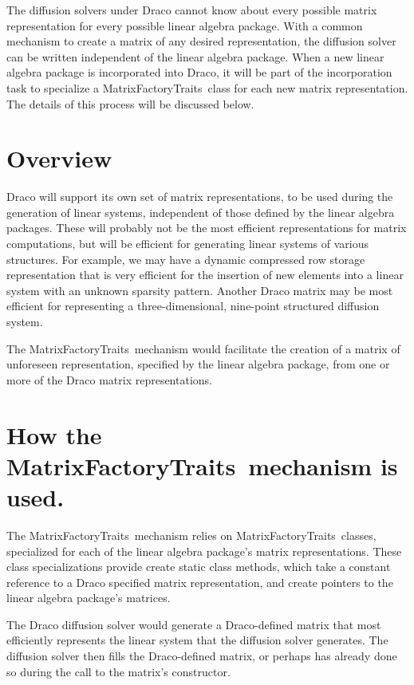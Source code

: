 \documentclass[11pt]{nmemo}
\newcommand{\code}[1]{\textcolor{codecolor}{#1}}
\newcommand{\MFT}{\code{MatrixFactoryTraits}\ }
\begin{document}
The diffusion solvers under Draco cannot know about every possible matrix
representation for every possible linear algebra package.
With a common mechanism to create a matrix of any desired representation,
the diffusion solver can be written independent of the linear algebra
package.
When a new linear algebra package is incorporated into Draco, it will be part
of the incorporation task to specialize a \MFT class
for each new matrix representation.
The details of this process will be discussed below.

\section{Overview}

Draco will support its own set of matrix representations, to be used during
the generation of linear systems, independent of those defined by the 
linear algebra packages.
These will probably not be the most efficient representations for matrix
computations, but will be efficient for generating linear systems of various
structures.
For example, we may have a dynamic compressed row storage representation that
is very efficient for the insertion of new elements into a linear
system with an unknown sparsity pattern.
Another Draco matrix may be most efficient for representing a three-dimensional,
nine-point structured diffusion system.

The \MFT mechanism would facilitate the creation
of a matrix of unforeseen representation, specified by the linear algebra
package, from one or more of the Draco matrix
representations.

\section{How the \MFT mechanism is used.}

The \MFT mechanism relies on \MFT classes, specialized for each
of the linear algebra package's matrix representations.
These class specializations
provide \code{create} static class methods, which take
a constant reference to a Draco specified matrix representation, and create
pointers to the linear algebra package's matrices.

The Draco diffusion solver would generate a Draco-defined matrix that most
efficiently represents the linear system that the diffusion solver generates.
The diffusion solver then fills the Draco-defined matrix, or perhaps has already
done so during the call to the matrix's constructor.
\end{document}
